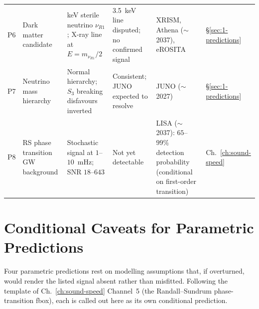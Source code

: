 \begin{table}[h!]
\begin{tabular}{@{}p{0.6cm}p{3.5cm}p{3.4cm}p{3.4cm}p{2.8cm}p{1.8cm}@{}}
P6 &
Dark matter candidate &
keV sterile neutrino $\nu_{R1}$; X-ray line at $E = m_{\nu_{R1}}/2$ &
3.5~keV line disputed; no confirmed signal &
XRISM, Athena ($\sim$2037), eROSITA &
\S\ref{sec:1-predictions} \\

P7 &
Neutrino mass hierarchy &
Normal hierarchy; $S_3$ breaking disfavours inverted &
Consistent; JUNO expected to resolve &
JUNO ($\sim$2027) &
\S\ref{sec:1-predictions} \\

P8 &
RS phase transition GW background &
Stochastic signal at $1$--$10$~mHz; SNR $18$--$643$ &
Not yet detectable &
LISA ($\sim$2037): $65$--$99\%$ detection probability (conditional on first-order transition) &
Ch.~\ref{ch:sound-speed} \\

\bottomrule
\end{tabular}
\end{table}

\section{Conditional Caveats for Parametric Predictions}
\label{app:pred-conditional}

Four parametric predictions rest on modelling assumptions that, if
overturned, would render the listed signal absent rather than
misfitted. Following the template of Ch.~\ref{ch:sound-speed} Channel~5
(the Randall--Sundrum phase-transition fbox), each is called out here
as its own conditional prediction.

\noindent{}

\medskip

